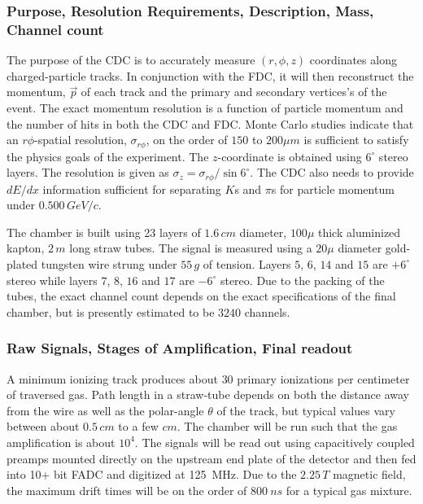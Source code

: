 \subsubsection*{Purpose, Resolution Requirements, Description, Mass, Channel count}

The purpose of the CDC is to accurately measure $(r,\phi,z)$
coordinates along charged-particle tracks. In conjunction with the FDC, it
will then  reconstruct the momentum, $\vec{p}$ of each track and the primary and
secondary vertices's of the event. The exact momentum resolution is a function 
of particle momentum and the number of hits in both the CDC and FDC. Monte Carlo
studies indicate that an $r\phi$-spatial resolution, $\sigma_{r\phi}$, on the 
order of $150$ to $200\mu m$ is sufficient to satisfy the physics goals of the 
experiment. The $z$-coordinate is obtained using $6^{\circ}$ stereo layers. 
The resolution is given as $\sigma_{z}=\sigma_{r\phi}/\sin 6^{\circ}$.  
The CDC also needs to provide $dE/dx$ information sufficient for separating 
$K$s and $\pi$s for particle momentum under $0.500\,GeV/c$.

The chamber is built using 23 layers of $1.6\,cm$ diameter, $100\mu$ thick
aluminized kapton, $2\,m$ long straw tubes. The signal is measured using a
$20\mu$ diameter gold-plated tungsten wire strung under $55\, g$ of tension.
Layers $5$, $6$, $14$ and $15$ are $+6^{\circ}$ stereo while layers
$7$, $8$, $16$ and $17$ are $-6^{\circ}$ stereo. Due to the packing of the
tubes, the exact channel count depends on the exact specifications of the
final chamber, but is presently estimated to be $3240$ channels.

\subsubsection*{Raw Signals, Stages of Amplification, Final readout}

A minimum ionizing track produces about $30$ primary ionizations per 
centimeter of traversed gas. Path length in a straw-tube depends on
both the distance away from the wire as well as the polar-angle $\theta$
of the track, but typical values vary between about $0.5\, cm$ to a few $cm$.
The chamber will be run such that the gas amplification is about $10^{4}$.
The signals will be read out using capacitively coupled preamps mounted
directly on the upstream end plate of the detector and then fed into 10+ bit
FADC and digitized at 125~MHz. Due to the $2.25\, T$ magnetic field, the maximum
drift times will be on the order of $800~ns$ for a typical gas mixture. 


